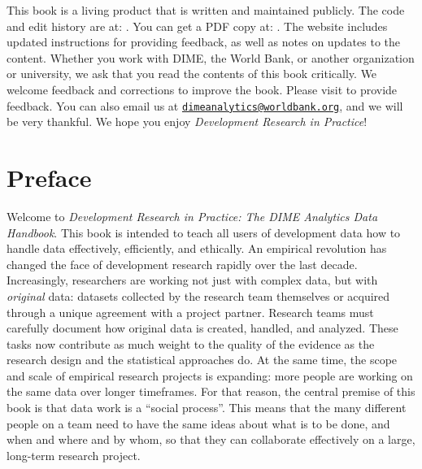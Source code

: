 \documentclass[]{tufte-book}
\begin{document}
This book is a living product that is written and maintained publicly.
The code and edit history are at:
\href{https://github.com/worldbank/dime-data-handbook}{}. You can get a
PDF copy at: \href{https://worldbank.github.com/dime-data-handbook}{}.
The website includes updated instructions for providing feedback, as
well as notes on updates to the content. Whether you work with DIME, the
World Bank, or another organization or university, we ask that you read
the contents of this book critically. We welcome feedback and
corrections to improve the book. Please visit
\href{https://worldbank.github.com/dime-data-handbook/feedback}{} to
provide feedback. You can also email us at
\href{mailto:dimeanalytics@worldbank.org}{\nolinkurl{dimeanalytics@worldbank.org}},
and we will be very thankful. We hope you enjoy \emph{Development
Research in Practice}!

\hypertarget{preface}{%
\chapter*{Preface}\label{preface}}

Welcome to \emph{Development Research in Practice: The DIME Analytics
Data Handbook}. This book is intended to teach all users of development
data how to handle data effectively, efficiently, and ethically. An
empirical revolution has changed the face of development research
rapidly over the last decade. Increasingly, researchers are working not
just with complex data, but with \emph{original} data: datasets
collected by the research team themselves or acquired through a unique
agreement with a project partner. Research teams must carefully document
how original data is created, handled, and analyzed. These tasks now
contribute as much weight to the quality of the evidence as the research
design and the statistical approaches do. At the same time, the scope
and scale of empirical research projects is expanding: more people are
working on the same data over longer timeframes. For that reason, the
central premise of this book is that data work is a ``social process''.
This means that the many different people on a team need to have the
same ideas about what is to be done, and when and where and by whom, so
that they can collaborate effectively on a large, long-term research
project.
\end{document}
